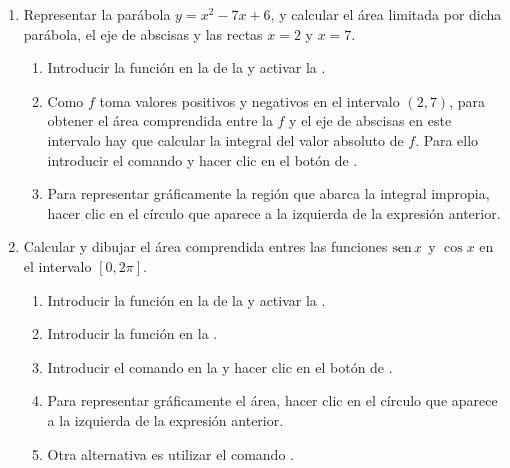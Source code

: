 \begin{enumerate}[leftmargin=*]
\item Representar la parábola $y=x^{2}-7x+6$, y calcular el área limitada por dicha parábola, el eje de abscisas y las rectas $x=2$ y $x=7$.
      \begin{indication}
      \begin{enumerate}
      \item Introducir la función  en la  de la  y activar la .
      \item Como $f$ toma valores positivos y negativos en el intervalo $(2,7)$, para obtener el área comprendida entre la $f$ y el eje de abscisas en este intervalo hay que calcular la integral del valor absoluto de $f$.
            Para ello introducir el comando  y hacer clic en el botón de .
      \item Para representar gráficamente la región que abarca la integral impropia, hacer clic en el círculo que aparece a la izquierda de la expresión anterior.
      \end{enumerate}
      \end{indication}


\item Calcular y dibujar el área comprendida entres las funciones $\operatorname{sen} x$ y $\cos x$ en el intervalo $[0,2\pi]$.
      \begin{indication}
      \begin{enumerate}
      \item Introducir la función  en la  de la  y activar la .
      \item Introducir la función  en la .
      \item Introducir el comando  en la  y hacer clic en el botón de .
      \item Para representar gráficamente el área, hacer clic en el círculo que aparece a la izquierda de la expresión anterior.
      \item Otra alternativa es utilizar el comando .
      \end{enumerate}
      \end{indication}



\end{enumerate}
